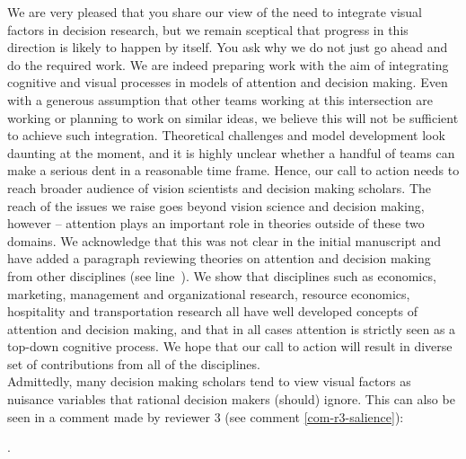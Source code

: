 We are very pleased that you share our view of the need to integrate visual factors in decision research, but we remain sceptical that progress in this direction is likely to happen by itself. You ask why we do not just go ahead and do the required work. We are indeed preparing work with the aim of integrating cognitive and visual processes in models of attention and decision making. Even with a generous assumption that other teams working at this intersection are working or planning to work on similar ideas, we believe this will not be sufficient to achieve such integration. Theoretical challenges and model development look daunting at the moment, and it is highly unclear whether a handful of teams can make a serious dent in a reasonable time frame. Hence, our call to action needs to reach broader audience of vision scientists and decision making scholars. The reach of the issues we raise goes beyond vision science and decision making, however -- attention plays an important role in theories outside of these two domains. We acknowledge that this was not clear in the initial manuscript and have added a paragraph reviewing theories on attention and decision making from other disciplines (see line~). We show that disciplines such as economics, marketing, management and organizational research, resource economics, hospitality and transportation research all have well developed concepts of attention and decision making, and that in all cases attention is strictly seen as a top-down cognitive process. We hope that our call to action will result in diverse set of contributions from all of the disciplines.\\

Admittedly, many decision making scholars tend to view visual factors as nuisance variables that rational decision makers (should) ignore. This can also be seen in a comment made by reviewer 3 (see comment \ref{com-r3-salience}): 

. 

